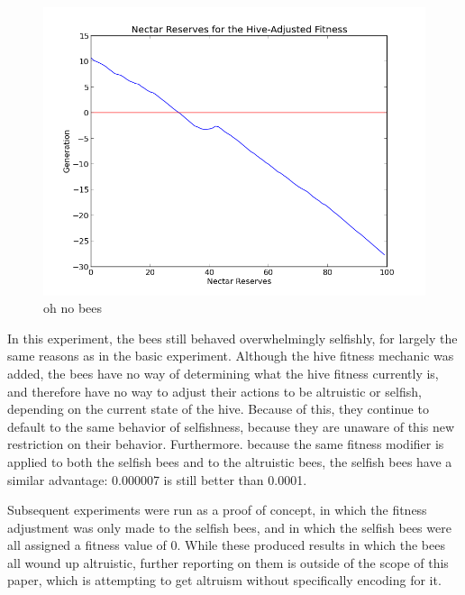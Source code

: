 \documentclass[11pt]{article}
\begin{document}
			\begin{figure}[tb]
				\begin{center}
					\includegraphics[scale=.5]{results/hive_fitness_res.png}
				\end{center}
				\caption{oh no bees}
				\label{fig:hive_fitness_reserves}
			\end{figure}

			In this experiment, the bees still behaved overwhelmingly selfishly, for largely the same reasons as in the basic experiment. Although the hive fitness mechanic was added, the bees have no way of determining what the hive fitness currently is, and therefore have no way to adjust their actions to be altruistic or selfish, depending on the current state of the hive. Because of this, they continue to default to the same behavior of selfishness, because they are unaware of this new restriction on their behavior. Furthermore. because the same fitness modifier is applied to both the selfish bees and to the altruistic bees, the selfish bees have a similar advantage: 0.000007 is still better than 0.0001.

			Subsequent experiments were run as a proof of concept, in which the fitness adjustment was only made to the selfish bees, and in which the selfish bees were all assigned a fitness value of 0. While these produced results in which the bees all wound up altruistic, further reporting on them is outside of the scope of this paper, which is attempting to get altruism without specifically encoding for it.

\end{document}
